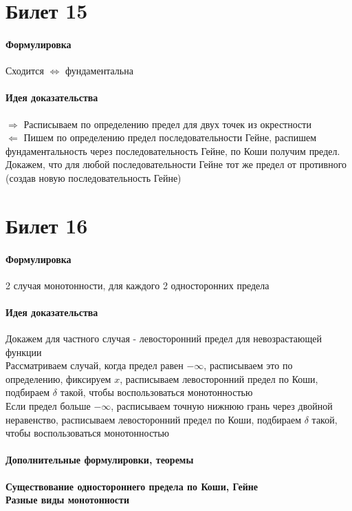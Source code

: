 \documentclass[a4paper,10pt]{article}
\begin{document}
	\section{Билет 15}
	\begin{center} 
		\item \paragraph{Формулировка} 
	\end{center}
	Сходится $\Leftrightarrow$ фундаментальна
	\begin{center} 
		\item \paragraph{Идея доказательства} 
	\end{center}
	$\Rightarrow$ Расписываем по определению предел для двух точек из окрестности \\
	$\Leftarrow$ Пишем по определению предел последовательности Гейне, распишем фундаментальность через последовательность Гейне, по Коши получим предел. Докажем, что для любой последовательности Гейне тот же предел от противного (создав новую последовательность Гейне)
	\section{Билет 16}
	\begin{center} 
		\item \paragraph{Формулировка} 
	\end{center}
	2 случая монотонности, для каждого 2 односторонних предела
	\begin{center} 
		\item \paragraph{Идея доказательства} 
	\end{center}
	Докажем для частного случая - левосторонний предел для невозрастающей функции \\
	Рассматриваем случай, когда предел равен $-\infty$, расписываем это по определению, фиксируем $x$, расписываем левосторонний предел по Коши, подбираем $\delta$ такой, чтобы воспользоваться монотонностью \\
	Если предел больше $-\infty$, расписываем точную нижнюю грань через двойной неравенство, расписываем левосторонний предел по Коши, подбираем $\delta$ такой, чтобы воспользоваться монотонностью
	\begin{center} 
		\item \paragraph{Дополнительные формулировки, теоремы} 
	\end{center}
	\textbf{Существование одностороннего предела по Коши, Гейне} \\
	\textbf{Разные виды монотонности}
\end{document}
